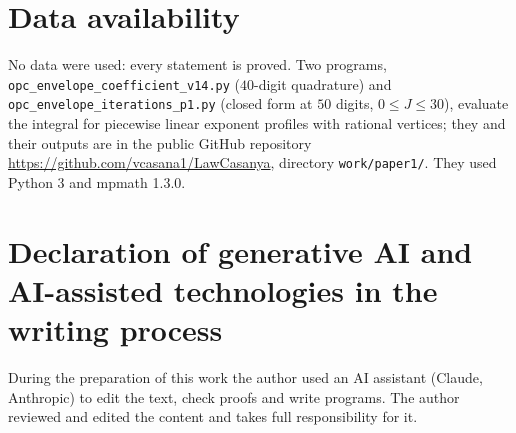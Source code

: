 \section*{Data availability}
No data were used: every statement is proved. Two programs, \texttt{opc\_envelope\_\allowbreak coefficient\_v14.py} ($40$-digit quadrature) and \texttt{opc\_envelope\_\allowbreak iterations\_p1.py} (closed form at $50$ digits, $0\le J\le30$), evaluate the integral  for piecewise linear exponent profiles with rational vertices; they and their outputs are in the public GitHub repository \url{https://github.com/vcasana1/LawCasanya}, directory \texttt{work/paper1/}. They used Python 3 and mpmath 1.3.0.

\section*{Declaration of generative AI and AI-assisted technologies in the writing process}
During the preparation of this work the author used an AI assistant (Claude, Anthropic) to edit the text, check proofs and write programs. The author reviewed and edited the content and takes full responsibility for it.

